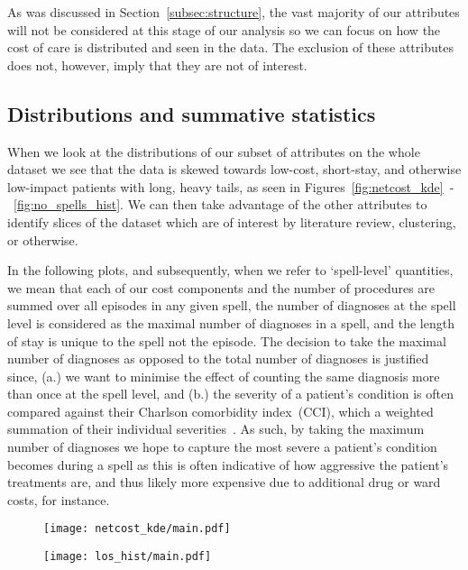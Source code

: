 As was discussed in Section~\ref{subsec:structure}, the vast majority of our
attributes will not be considered at this stage of our analysis so we can focus
on how the cost of care is distributed and seen in the data. The exclusion of
these attributes does not, however, imply that they are not of interest. 

\subsection{Distributions and summative
statistics}\label{subsec:distributions_statistics}
\graphicspath{{./img/general/}}

When we look at the distributions of our subset of attributes on the whole
dataset we see that the data is skewed towards low-cost, short-stay, and
otherwise low-impact patients with long, heavy tails, as seen in
Figures~\ref{fig:netcost_kde}~\--~\ref{fig:no_spells_hist}. We can then take
advantage of the other attributes to identify slices of the dataset which are of
interest by literature review, clustering, or otherwise.

In the following plots, and subsequently, when we refer to `spell-level'
quantities, we mean that each of our cost components and the number of
procedures are summed over all episodes in any given spell, the number of
diagnoses at the spell level is considered as the maximal number of diagnoses in
a spell, and the length of stay is unique to the spell not the episode. The
decision to take the maximal number of diagnoses as opposed to the total number
of diagnoses is justified since, (a.) we want to minimise the effect of counting
the same diagnosis more than once at the spell level, and (b.) the severity of a
patient's condition is often compared against their Charlson comorbidity
index~(CCI), which a weighted summation of their individual
severities~\cite{Thygesen2011}. As such, by taking the maximum number of
diagnoses we hope to capture the most severe a patient's condition becomes
during a spell as this is often indicative of how aggressive the patient's
treatments are, and thus likely more expensive due to additional drug or ward
costs, for instance.

\begin{figure}[h]
    \centering
    \begin{minipage}{.495\textwidth}
        \texttt{[image: netcost\_kde/main.pdf]}
        \label{fig:netcost_kde}
    \end{minipage}\hfill%
    \begin{minipage}{.495\textwidth}
        \texttt{[image: los\_hist/main.pdf]}
        \label{fig:los_hist}
    \end{minipage}
\end{figure}


